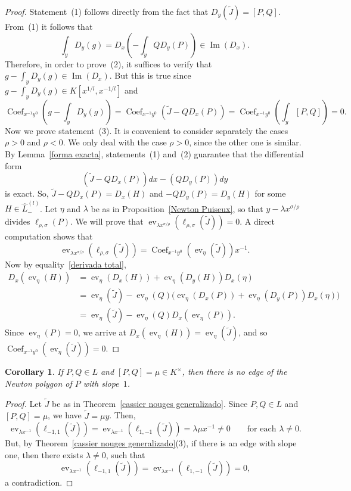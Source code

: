 \documentclass[reqno,a4paper]{amsart}
\newtheorem{corollary}[theorem]{Corollary}
\theoremstyle{definition}
\theoremstyle{remark}
\DeclareMathOperator{\ev}{ev}
\DeclareMathOperator{\Ima}{Im}
\DeclareMathOperator{\Coef}{Coef}
\begin{document}
\begin{proof} Statement~(1) follows directly from the fact that $D_y(\tilde J)=[P,Q]$. From~(1) it follows that
$$
\int_y D_y(g)=D_x\left(-\int_y Q D_y(P)\right)\in \Ima(D_x).
$$
Therefore, in order to prove~(2), it suffices to verify that $g-\int_y D_y(g)\in \Ima(D_x)$. But this is true since $g-\int_y D_y(g)\in
K[x^{1/l},x^{-1/l}]$ and
$$
\Coef_{x^{-1}y^0}\left(g-\int_y D_y(g)\right)=\Coef_{x^{-1}y^0}\left(\tilde J-Q D_x(P) \right)=\Coef_{x^{-1}y^0}\left(\int_y [P,Q]\right)=0.
$$
Now we prove statement~(3). It is convenient to consider separately the cases $\rho>0$ and $\rho<0$. We only deal with the case $\rho>0$, since the other one is similar. By Lemma~\ref{forma exacta}, statements~(1) and~(2) guarantee that the differential form
$$
(\tilde J -Q D_x(P))dx-(Q D_y(P))dy
$$
is exact. So, $\tilde J -Q D_x(P)=D_x(H) $ and $-Q D_y(P)=D_y(H)$ for some $H\in \hat L^{(l)}_-$. Let $\eta$ and $\lambda$ be as in Proposition~\ref{Newton Puiseux}, so that $y-\lambda x^{\sigma/\rho}$ divides $\ell_{\rho,\sigma}(P)$. We will prove that $\ev_{\lambda x^{\sigma/\rho}}(\ell_{\rho,\sigma}(\tilde J)) =0$. A direct computation shows that
$$
\ev_{\lambda x^{\sigma/\rho}}(\ell_{\rho,\sigma}(\tilde J))=\Coef_{x^{-1}y^0}(\ev_{\eta}(\tilde J))x^{-1}.
$$
Now by equality~\eqref{derivada total},
\begin{align*}
D_x(\ev_{\eta}(H)) &=\ev_{\eta}(D_x(H))+\ev_{\eta}(D_y(H))D_x(\eta)\\
%
&=\ev_{\eta}(\tilde J)-\ev_{\eta}(Q)\bigl(\ev_{\eta}(D_x(P))+\ev_{\eta}(D_y(P))D_x(\eta)\bigr)\\
%
&=\ev_{\eta}(\tilde J)-\ev_{\eta}(Q)D_x(\ev_\eta(P)).
\end{align*}
Since $\ev_{\eta}(P)=0$, we arrive at $D_x(\ev_{\eta}(H)) = \ev_{\eta}(\tilde J)$, and so $\Coef_{x^{-1}y^0}(\ev_{\eta}(\tilde J))=0$.
\end{proof}

\begin{corollary}\label{cassier nouges} If $P,Q\in L$ and $[P,Q]=\mu\in K^{\times}$, then there is no edge of the Newton polygon of $P$ with slope~$1$.
\end{corollary}

\begin{proof} Let $\tilde J$ be as in Theorem~\ref{cassier nouges generalizado}. Since $P,Q\in L$ and $[P,Q]=\mu$, we have $\tilde J=\mu y$. Then,
$$
\ev_{\lambda x^{-1}}(\ell_{-1,1}(\tilde J))=\ev_{\lambda x^{-1}}(\ell_{1,-1}(\tilde J))=\lambda \mu x^{-1}\ne 0\qquad\text{for each $\lambda\ne 0$.}
$$
But, by Theorem~\ref{cassier nouges generalizado}(3), if there is an edge with slope one, then there exists $\lambda\ne0$, such that
$$
\ev_{\lambda x^{-1}}(\ell_{-1,1}(\tilde J))=\ev_{\lambda x^{-1}}(\ell_{1,-1}(\tilde J))= 0,
$$
a contradiction.
\end{proof}
\end{document}
